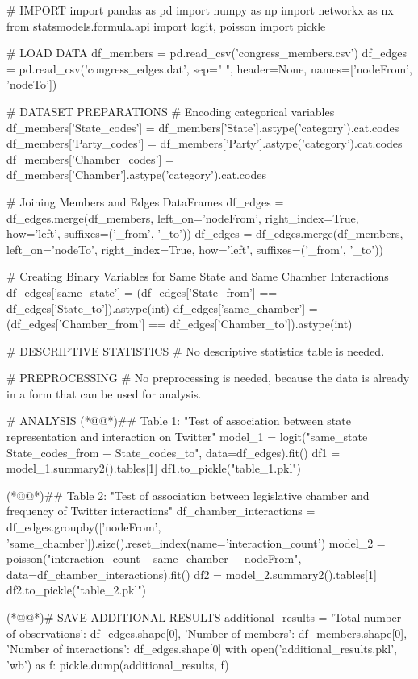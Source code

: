 \documentclass[11pt]{article}
\begin{document}
\begin{python}

# IMPORT
import pandas as pd
import numpy as np
import networkx as nx
from statsmodels.formula.api import logit, poisson
import pickle

# LOAD DATA
df_members = pd.read_csv('congress_members.csv')
df_edges = pd.read_csv('congress_edges.dat', sep=" ", header=None, names=['nodeFrom', 'nodeTo'])

# DATASET PREPARATIONS
# Encoding categorical variables
df_members['State_codes'] = df_members['State'].astype('category').cat.codes
df_members['Party_codes'] = df_members['Party'].astype('category').cat.codes
df_members['Chamber_codes'] = df_members['Chamber'].astype('category').cat.codes

# Joining Members and Edges DataFrames
df_edges = df_edges.merge(df_members, left_on='nodeFrom', right_index=True, how='left', suffixes=('_from', '_to'))
df_edges = df_edges.merge(df_members, left_on='nodeTo', right_index=True, how='left', suffixes=('_from', '_to'))

# Creating Binary Variables for Same State and Same Chamber Interactions
df_edges['same_state'] = (df_edges['State_from'] == df_edges['State_to']).astype(int)
df_edges['same_chamber'] = (df_edges['Chamber_from'] == df_edges['Chamber_to']).astype(int)

# DESCRIPTIVE STATISTICS
# No descriptive statistics table is needed.

# PREPROCESSING
# No preprocessing is needed, because the data is already in a form that can be used for analysis.

# ANALYSIS
(*@@*)## Table 1: "Test of association between state representation and interaction on Twitter"
model_1 = logit("same_state ~ State_codes_from + State_codes_to", data=df_edges).fit()
df1 = model_1.summary2().tables[1]
df1.to_pickle("table_1.pkl")

(*@@*)## Table 2: "Test of association between legislative chamber and frequency of Twitter interactions"
df_chamber_interactions = df_edges.groupby(['nodeFrom', 'same_chamber']).size().reset_index(name='interaction_count')
model_2 = poisson("interaction_count ~ same_chamber + nodeFrom", data=df_chamber_interactions).fit()
df2 = model_2.summary2().tables[1]
df2.to_pickle("table_2.pkl")

(*@@*)# SAVE ADDITIONAL RESULTS
additional_results = {
    'Total number of observations': df_edges.shape[0],         
    'Number of members': df_members.shape[0],
    'Number of interactions': df_edges.shape[0]
}
with open('additional_results.pkl', 'wb') as f:
    pickle.dump(additional_results, f)

\end{python}
\end{document}
